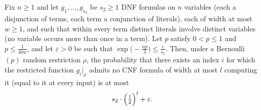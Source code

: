 \begin{theorem}
\label{LMN.layer2_cnf_replaceability_simplified}
\leanok
{}
Fix $n \ge 1$ and let $g_1, \dots, g_{s_2}$ be $s_2 \ge 1$ DNF formulas on $n$ variables
(each a disjunction of terms, each term a conjunction of literals), each of width at
most $w \ge 1$, and such that within every term distinct literals involve distinct
variables (no variable occurs more than once in a term). Let $p$ satisfy $0 < p \le 1$
and $p \le \tfrac{1}{40w}$, and let $\varepsilon > 0$ be such that
$\exp\!\bigl(-\tfrac{np}{3}\bigr) \le \tfrac{\varepsilon}{s_2}$. Then, under a
Bernoulli$(p)$ random restriction $\rho$, the probability that there exists an index $i$
for which the restricted function $g_i|_\rho$ admits no CNF formula of width at most $l$
computing it (equal to it at every input) is at most
\[
  s_2 \cdot \Bigl(\tfrac12\Bigr)^{l} + \varepsilon .
\]
\end{theorem}
